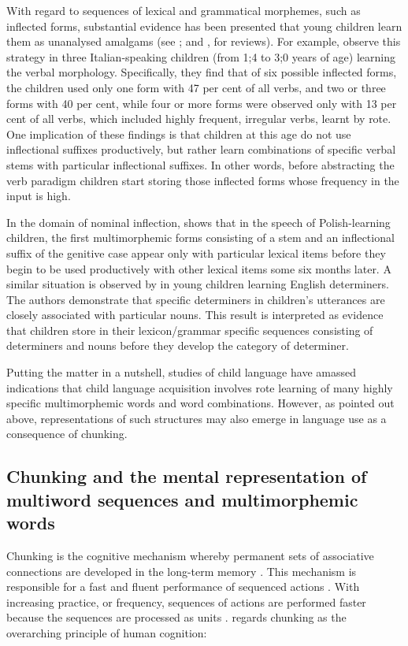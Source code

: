 With regard to sequences of lexical and grammatical morphemes, such as inflected forms, substantial evidence has been presented that young children learn them as unanalysed amalgams (see \citealt[][118--119]{tomasello-constructing-2003}; and \citealt[190--193]{clark-2009}, for reviews). For example, \citet{pizzuto-caselli-1992} observe this strategy in three Italian-speaking children (from 1;4 to 3;0 years of age) learning the verbal morphology. Specifically, they find that of six possible inflected forms, the children used only one form with 47 per cent of all verbs, and two or three forms with 40 per cent, while four or more forms were observed only with 13 per cent of all verbs, which included highly frequent, irregular verbs, learnt by rote. One implication of these findings is that children at this age do not use inflectional suffixes productively, but rather learn combinations of specific verbal stems with particular inflectional suffixes. In other words, before abstracting the verb paradigm children start storing those inflected forms whose frequency in the input is high. 
 
\begin{sloppypar}
In the domain of nominal inflection, \citet{dabrowska-2004} shows that in the speech of Polish-learning children, the first multimorphemic forms consisting of a stem and an inflectional suffix of the genitive case appear only with particular lexical items before they begin to be used productively with other lexical items some six months later. A similar situation is observed by \citet{pine-lieven-1997} in young children learning English determiners. The authors demonstrate that specific determiners in children's utterances are closely associated with particular nouns. This result is interpreted as evidence that children store in their lexicon/grammar specific sequences consisting of determiners and nouns before they develop the category of determiner. 
\end{sloppypar}

Putting the matter in a nutshell, studies of child language have amassed indications that child language acquisition involves rote learning of many highly specific multimorphemic words and word combinations. However, as pointed out above, representations of such structures may also emerge in language use as a consequence of chunking.

\subsection{Chunking and the mental representation of multiword sequences and multimorphemic words}\label{chunking}
Chunking is the cognitive mechanism whereby permanent sets of associative connections are developed in the long-term memory \citep[][]{ellis-1996}. This mechanism is responsible for a fast and fluent performance of sequenced actions \citep{melton-1963}. With increasing practice, or frequency, sequences of actions are performed faster because the sequences are processed as units \citep{miller-1956,anderson-1982}. \citet{newell-1990} regards chunking as the overarching principle of human cognition:


